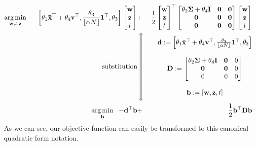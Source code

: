 \begin{eqnarray}
\argmin_{\mathbf{w},t,\mathbf{z}} \ \ - \left[\theta_1\mathbf{\bar{x}}^\top+ \theta_4 \mathbf{v}^\top , \frac{\theta_3}{\lfloor{\alpha N}\rfloor}\mathbf{1}^\top, \theta_3\right] \begin{bmatrix}
\mathbf{w} \\ \mathbf{z} \\ t
\end{bmatrix} &+& \frac{1}{2} \begin{bmatrix} 
\mathbf{w} \\ \mathbf{z} \\ t
\end{bmatrix}^\top \begin{bmatrix}
\theta_2\mathbf{\Sigma} +\theta_4 \mathbf{I}  & \mathbf{0} & \mathbf{0} \\ \mathbf{0} & \mathbf{0} & \mathbf{0} \\ \mathbf{0} & \mathbf{0} & \mathbf{0}
\end{bmatrix}\begin{bmatrix} 
\mathbf{w} \\ \mathbf{z} \\ t
\end{bmatrix}\\
\text{substitution}&\left\Updownarrow\vphantom{\begin{matrix}
	d:=\left[\theta_1\mathbf{\bar{x}}^\top+ \theta_4 \mathbf{v}^\top , \frac{\theta_3}{\lfloor{\alpha N}\rfloor}\mathbf{1}^\top, \theta_3\right] \\\\
	D:= \begin{bmatrix}
	\theta_2\mathbf{\Sigma} +\theta_4 \mathbf{I}  & \mathbf{0} & \mathbf{0} \\ \mathbf{0} & \mathbf{0} & \mathbf{0} \\ \mathbf{0} & \mathbf{0} & \mathbf{0} \\ \mathbf{0} & \mathbf{0} & \mathbf{0}
	\end{bmatrix}\\\\
	b:=\left[w,z,t\right]
	\end{matrix}}\right.&
\begin{matrix}
\mathbf{d}:=\left[\theta_1\mathbf{\bar{x}}^\top+ \theta_4 \mathbf{v}^\top , \frac{\theta_3}{\lfloor{\alpha N}\rfloor}\mathbf{1}^\top, \theta_3\right] \\\\
\mathbf{D}:= \begin{bmatrix}
\theta_2\mathbf{\Sigma} +\theta_4 \mathbf{I}  & \mathbf{0} & 0 \\ \mathbf{0} & \mathbf{0} & 0 \\ 0 & 0 & 0
\end{bmatrix} \\\\
\mathbf{b}:=\left[\mathbf{w},\mathbf{z},t\right]
\end{matrix}\\
\argmin_{\mathbf{b}} \ \ -\mathbf{d}^\top \mathbf{b} &+& \frac{1}{2} \mathbf{b}^\top \mathbf{D} \mathbf{b}
\end{eqnarray}
As we can see, our objective function can easily be transformed to this canonical quadratic form notation.

